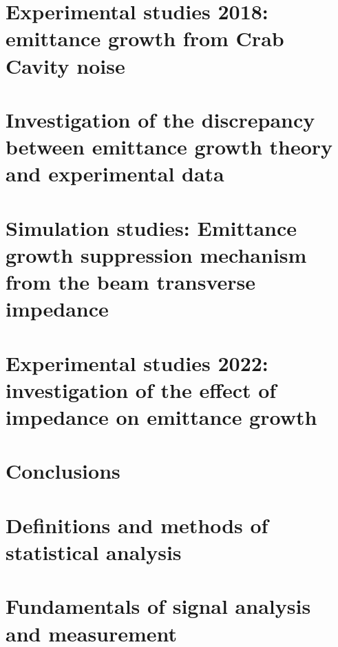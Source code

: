 \documentclass[12pt,twoside]{report} %
\begin{document}
\chapter{Experimental studies 2018: emittance growth from Crab Cavity noise}\label{Ch:2018_analyisis}


%

\chapter{Investigation of the discrepancy between emittance growth theory and experimental data}\label{Ch:investigating_discrepancy}


\chapter{Simulation studies: Emittance growth suppression mechanism from the beam transverse impedance}\label{Ch:suppression_impedances}\label{Ch:suppression_impedance}


\chapter{Experimental studies 2022: investigation of the effect of impedance on emittance growth}\label{Ch:experimental_CC_2022}


\chapter{Conclusions}


\printglossaries
\appendix
\chapter{Definitions and  methods of statistical analysis}\label{ch:app_A}

\chapter{Fundamentals of signal analysis and measurement}\label{ch:app_B}

\end{document}

